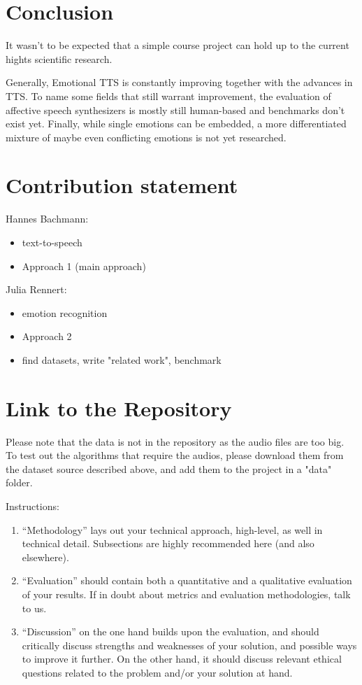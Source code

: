 \documentclass[11pt]{article}
\begin{document}
\section{Conclusion}
\label{conclusion}
It wasn't to be expected that a simple course project can hold up to the current hights scientific research.

Generally, Emotional TTS is constantly improving together with the advances in TTS. To name some fields that still warrant improvement, the evaluation of affective speech synthesizers is mostly still human-based and benchmarks don't exist yet. Finally, while single emotions can be embedded, a more differentiated mixture of maybe even conflicting emotions is not yet researched.

\section{Contribution statement}
Hannes Bachmann:
\begin{itemize}
\item text-to-speech
\item Approach 1 (main approach)
\end{itemize}
Julia Rennert:
\begin{itemize}
\item emotion recognition
\item Approach 2
\item find datasets, write "related work", benchmark
\end{itemize}

\section{Link to the Repository}

Please note that the data is not in the repository as the audio files are too big. To test out the algorithms that require the audios, please download them from the dataset source described above, and add them to the project in a "data" folder.

% 

%

Instructions: 
\begin{enumerate}


    \item ``Methodology'' lays out your technical approach, high-level, as well in technical detail. Subsections are highly recommended here (and also elsewhere).
    \item ``Evaluation'' should contain both a quantitative and a qualitative evaluation of your results. If in doubt about metrics and evaluation methodologies, talk to us.
    \item ``Discussion'' on the one hand builds upon the evaluation, and should critically discuss strengths and weaknesses of your solution, and possible ways to improve it further. On the other hand, it should discuss relevant ethical questions related to the problem and/or your solution at hand.
\end{enumerate}
\end{document}

